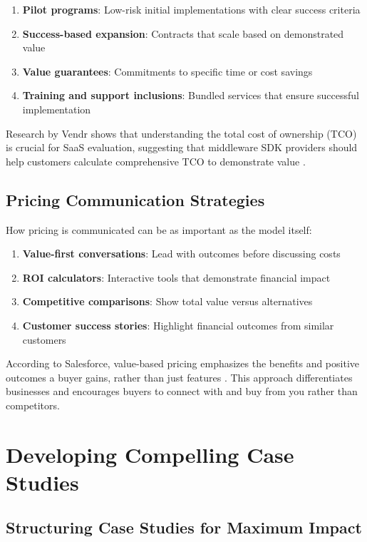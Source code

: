 \documentclass[11pt,a4paper]{article}
\begin{document}
\begin{enumerate}
    \item \textbf{Pilot programs}: Low-risk initial implementations with clear success criteria
    \item \textbf{Success-based expansion}: Contracts that scale based on demonstrated value
    \item \textbf{Value guarantees}: Commitments to specific time or cost savings
    \item \textbf{Training and support inclusions}: Bundled services that ensure successful implementation
\end{enumerate}

Research by Vendr shows that understanding the total cost of ownership (TCO) is crucial for SaaS evaluation, suggesting that middleware SDK providers should help customers calculate comprehensive TCO to demonstrate value \cite{vendr2023}.

\subsection{Pricing Communication Strategies}

How pricing is communicated can be as important as the model itself:

\begin{enumerate}
    \item \textbf{Value-first conversations}: Lead with outcomes before discussing costs
    \item \textbf{ROI calculators}: Interactive tools that demonstrate financial impact
    \item \textbf{Competitive comparisons}: Show total value versus alternatives
    \item \textbf{Customer success stories}: Highlight financial outcomes from similar customers
\end{enumerate}

According to Salesforce, value-based pricing emphasizes the benefits and positive outcomes a buyer gains, rather than just features \cite{salesforce2023}. This approach differentiates businesses and encourages buyers to connect with and buy from you rather than competitors.

\section{Developing Compelling Case Studies}

\subsection{Structuring Case Studies for Maximum Impact}
\end{document}

